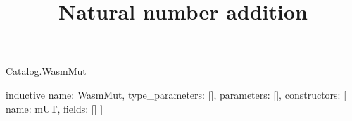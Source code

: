 \begin{lexlean}{Catalog.WasmMut}
\title{Natural number addition}
\begin{semanticmodule}
inductive{
  name: WasmMut,
  type_parameters: [],
  parameters: [],
  constructors: [
    {name: mUT, fields: []}
  ]
}
\end{semanticmodule}
\end{lexlean}
